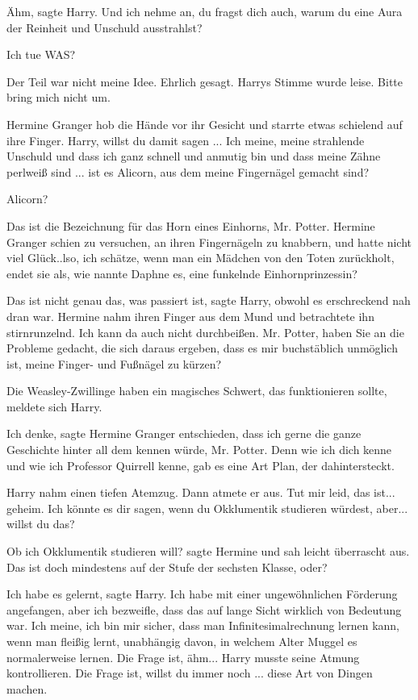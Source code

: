 \glqq{}Ähm\grqq{}, sagte Harry. \glqq{}Und ich nehme an, du fragst dich auch,
warum du eine Aura der Reinheit und Unschuld ausstrahlst?\grqq{}

\glqq{}Ich tue WAS?\grqq{}

\glqq{}Der Teil war nicht meine Idee. Ehrlich gesagt.\grqq{} Harrys Stimme wurde
leise. \glqq{}Bitte bring mich nicht um.\grqq{}

Hermine Granger hob die Hände vor ihr Gesicht und starrte etwas schielend auf
ihre Finger. \glqq{}Harry, willst du damit sagen ... Ich meine, meine strahlende
Unschuld und dass ich ganz schnell und anmutig bin und dass meine Zähne perlweiß
sind ... ist es Alicorn, aus dem meine Fingernägel gemacht sind?\grqq{}

\glqq{}Alicorn?\grqq{}

\glqq{}Das ist die Bezeichnung für das Horn eines Einhorns, Mr. Potter.\grqq{}
Hermine Granger schien zu versuchen, an ihren Fingernägeln zu knabbern, und
hatte nicht viel Glück.\grqq{}.lso, ich schätze, wenn man ein Mädchen von den
Toten zurückholt, endet sie als, wie nannte Daphne es, eine funkelnde
Einhornprinzessin?\grqq{}

\glqq{}Das ist nicht genau das, was passiert ist\grqq{}, sagte Harry, obwohl es
erschreckend nah dran war. Hermine nahm ihren Finger aus dem Mund und
betrachtete ihn stirnrunzelnd. \glqq{}Ich kann da auch nicht durchbeißen. Mr.
Potter, haben Sie an die Probleme gedacht, die sich daraus ergeben, dass es mir
buchstäblich unmöglich ist, meine Finger- und Fußnägel zu kürzen?\grqq{}

\glqq{}Die Weasley-Zwillinge haben ein magisches Schwert, das funktionieren
sollte\grqq{}, meldete sich Harry.

\glqq{}Ich denke\grqq{}, sagte Hermine Granger entschieden, \glqq{}dass ich gerne
die ganze Geschichte hinter all dem kennen würde, Mr. Potter. Denn wie ich dich
kenne und wie ich Professor Quirrell kenne, gab es eine Art Plan, der
dahintersteckt.\grqq{}

Harry nahm einen tiefen Atemzug. Dann atmete er aus. \glqq{}Tut mir leid, das
ist... geheim. Ich könnte es dir sagen, wenn du Okklumentik studieren würdest,
aber... willst du das?\grqq{}

\glqq{}Ob ich Okklumentik studieren will?\grqq{} sagte Hermine und sah leicht
überrascht aus. \glqq{}Das ist doch mindestens auf der Stufe der sechsten Klasse,
oder?\grqq{}

\glqq{}Ich habe es gelernt\grqq{}, sagte Harry. \glqq{}Ich habe mit einer
ungewöhnlichen Förderung angefangen, aber ich bezweifle, dass das auf lange
Sicht wirklich von Bedeutung war. Ich meine, ich bin mir sicher, dass man
Infinitesimalrechnung lernen kann, wenn man fleißig lernt, unabhängig davon, in
welchem Alter Muggel es normalerweise lernen. Die Frage ist, ähm...\grqq{} Harry
musste seine Atmung kontrollieren. \glqq{}Die Frage ist, willst du immer noch ...
diese Art von Dingen machen.\grqq{}

